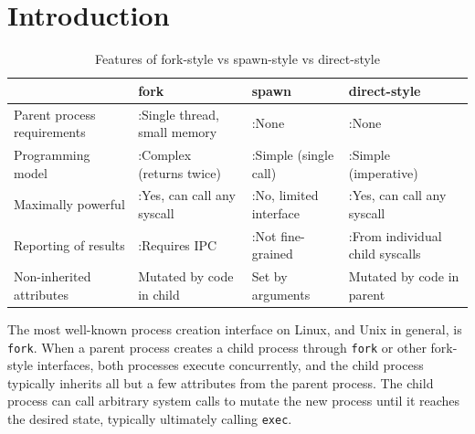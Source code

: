 \documentclass[letterpaper,twocolumn,10pt]{article}
\newcommand{\tbad}{\makebox[\widthof{\ding{51}}]{\ding{55}}:}
\newcommand{\tgood}{\ding{51}:}
\begin{document}
\section{Introduction}\label{introduction}
\begin{table}
\begin{tabular}{l|l|l|l}
 & fork & spawn & direct-style\\
\hline
Parent process requirements & \tbad Single thread, small memory & \tgood None & \tgood None\\
Programming model & \tbad Complex (returns twice) & \tgood Simple (single call) & \tgood Simple (imperative)\\
Maximally powerful & \tgood Yes, can call any syscall & \tbad No, limited interface & \tgood Yes, can call any syscall\\
Reporting of results & \tbad Requires IPC & \tbad Not fine-grained & \tgood From individual child syscalls\\
Non-inherited attributes & Mutated by code in child & Set by arguments & Mutated by code in parent\\
\end{tabular}
\caption{Features of fork-style vs spawn-style vs direct-style}
\label{tab:styles}
\end{table}

The most well-known process creation interface on Linux, and Unix in general, is \texttt{fork}.
When a parent process creates a child process through \texttt{fork} or other fork-style interfaces,
both processes execute concurrently,
and the child process typically inherits all but a few attributes from the parent process.\cite{manfork}
The child process can call arbitrary system calls
to mutate the new process until it reaches the desired state,
typically ultimately calling \texttt{exec}.
\end{document}
